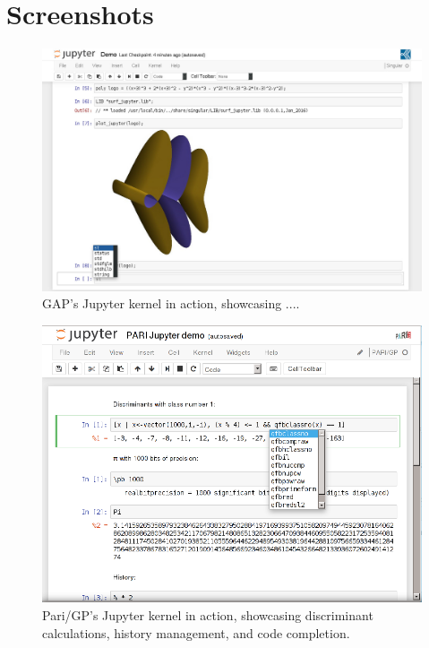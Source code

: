 \documentclass{deliverablereport}
\author{Nicolas M. Thiéry}
\begin{document}
\maketitle
\githubissuedescription
\tableofcontents
\clearpage
\section{Screenshots}
\begin{figure}[h]
  \includegraphics[height=.4\textheight]{screenshot-singular.png}
  \caption{GAP's Jupyter kernel in action, showcasing ....}
\end{figure}
\begin{figure}[h]
  \includegraphics[height=.4\textheight]{screenshot-pari.png}
  \caption{Pari/GP's Jupyter kernel in action, showcasing
    discriminant calculations, history management, and code
    completion.}
\end{figure}
\end{document}
